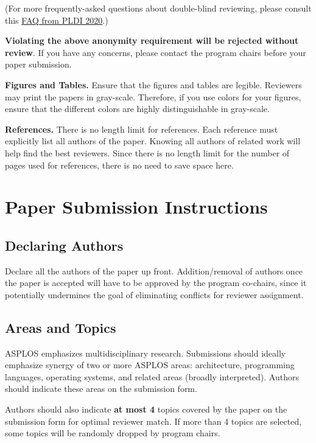 \documentclass[pageno]{jpaper}
\begin{document}
(For more frequently-asked questions about double-blind reviewing, please 
consult this 
\href{https://pldi20.sigplan.org/track/pldi-2020-papers#FAQ-on-Double-Blind-Reviewing}
{FAQ from PLDI 2020}.)

\textbf{Violating the above anonymity requirement will be rejected without review}. If you have any concerns, please contact the program chairs before your paper submission.

\noindent\textbf{Figures and Tables.} Ensure that the figures and tables
are legible. 
Reviewers may print the papers in gray-scale. Therefore, if you use
colors for your figures, ensure that the different colors are highly
distinguishable in gray-scale. 

\noindent\textbf{References.}  There is no length limit for references.
Each reference must explicitly list all authors of the paper.
Knowing all authors of related
work will help find the best reviewers. Since there is no length limit
for the number of pages used for references, there is no need to save space
here.


\section{Paper Submission Instructions}

\subsection{Declaring Authors}

Declare all the authors of the paper up front. Addition/removal of authors
once the paper is accepted will have to be approved by the program co-chairs,
since it potentially undermines the goal of eliminating conflicts for
reviewer assignment.

\subsection{Areas and Topics}

ASPLOS emphasizes multidisciplinary research. Submissions should ideally
emphasize synergy of two or more ASPLOS areas: architecture, programming
languages, operating systems, and related areas (broadly
interpreted). Authors should indicate these areas on the submission form.

Authors should also indicate \textbf{at most 4}
topics covered by the paper on the submission form 
for optimal reviewer match. If more than 4 topics are selected, some topics
will be randomly dropped by program chairs.
\end{document}
